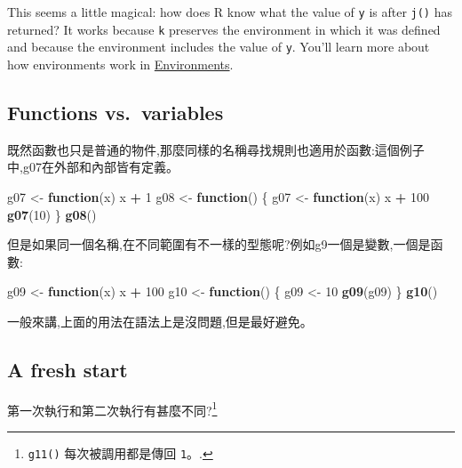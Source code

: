 \documentclass[]{book}
\newenvironment{Shaded}{\begin{snugshade}}{\end{snugshade}}
\newcommand{\KeywordTok}[1]{\textcolor[rgb]{0.13,0.29,0.53}{\textbf{#1}}}
\newcommand{\DecValTok}[1]{\textcolor[rgb]{0.00,0.00,0.81}{#1}}
\newcommand{\StringTok}[1]{\textcolor[rgb]{0.31,0.60,0.02}{#1}}
\newcommand{\ControlFlowTok}[1]{\textcolor[rgb]{0.13,0.29,0.53}{\textbf{#1}}}
\newcommand{\OperatorTok}[1]{\textcolor[rgb]{0.81,0.36,0.00}{\textbf{#1}}}
\newcommand{\NormalTok}[1]{#1}
\let\rmarkdownfootnote\footnote%
\def\footnote{\protect\rmarkdownfootnote}
\theoremstyle{definition}
\theoremstyle{definition}
\theoremstyle{definition}
\theoremstyle{remark}
\begin{document}
This seems a little magical: how does R know what the value of
\texttt{y} is after \texttt{j()} has returned? It works because
\texttt{k} preserves the environment in which it was defined and because
the environment includes the value of \texttt{y}. You'll learn more
about how environments work in
\protect\hyperlink{environments}{Environments}.

\subsection{Functions vs.~variables}\label{functions-vs.variables}

既然函數也只是普通的物件,那麼同樣的名稱尋找規則也適用於函數:這個例子中,g07在外部和內部皆有定義。

\begin{Shaded}
\begin{Highlighting}[]
\NormalTok{g07 <-}\StringTok{ }\ControlFlowTok{function}\NormalTok{(x) x }\OperatorTok{+}\StringTok{ }\DecValTok{1}
\NormalTok{g08 <-}\StringTok{ }\ControlFlowTok{function}\NormalTok{() \{}
\NormalTok{  g07 <-}\StringTok{ }\ControlFlowTok{function}\NormalTok{(x) x }\OperatorTok{+}\StringTok{ }\DecValTok{100}
  \KeywordTok{g07}\NormalTok{(}\DecValTok{10}\NormalTok{)}
\NormalTok{\}}
\KeywordTok{g08}\NormalTok{()}
\end{Highlighting}
\end{Shaded}

但是如果同一個名稱,在不同範圍有不一樣的型態呢?例如g9一個是變數,一個是函數:

\begin{Shaded}
\begin{Highlighting}[]
\NormalTok{g09 <-}\StringTok{ }\ControlFlowTok{function}\NormalTok{(x) x }\OperatorTok{+}\StringTok{ }\DecValTok{100}
\NormalTok{g10 <-}\StringTok{ }\ControlFlowTok{function}\NormalTok{() \{}
\NormalTok{  g09 <-}\StringTok{ }\DecValTok{10}
  \KeywordTok{g09}\NormalTok{(g09)}
\NormalTok{\}}
\KeywordTok{g10}\NormalTok{()}
\end{Highlighting}
\end{Shaded}

一般來講,上面的用法在語法上是沒問題,但是最好避免。

\hypertarget{fresh-start}{\subsection{A fresh start}\label{fresh-start}}

第一次執行和第二次執行有甚麼不同?\footnote{\texttt{g11()}
  每次被調用都是傳回 \texttt{1}。.}
\end{document}
